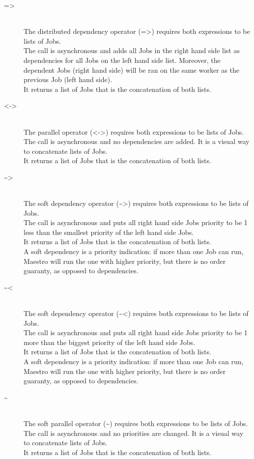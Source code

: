 \documentclass[12pt]{article}
\begin{document}
\begin{description}
\item[=>] \hfil \\
The distributed dependency operator (=>) requires both expressions to be lists of Jobs.\\
The call is asynchronous and adds all Jobs in the right hand side list as dependencies
for all Jobs on the left hand side list. Moreover, the dependent Jobs (right
hand side)  will be ran on the same worker as the previous Job (left hand
side).\\
It returns a list of Jobs that is the concatenation of both lists.

\item[<->] \hfil \\
The parallel operator (<->) requires both expressions to be lists of Jobs.\\
The call is asynchronous and no dependencies are added. It is a visual way to
concatenate lists of Jobs.\\
It returns a list of Jobs that is the concatenation of both lists.

\item[\textasciitilde>] \hfil \\
The soft dependency operator (\textasciitilde>) requires both expressions to be lists of Jobs.\\
The call is asynchronous and puts all right hand side Jobs priority to be 1 less than the smallest
priority of the left hand side Jobs.\\
It returns a list of Jobs that is the concatenation of both lists.\\
A soft dependency is a priority indication: if more than one Job can run, Maestro will run the
one with higher priority, but there is no order guaranty, as opposed to dependencies.

\item[\textasciitilde<] \hfil \\
The soft dependency operator (\textasciitilde<) requires both expressions to be lists of Jobs.\\
The call is asynchronous and puts all right hand side Jobs priority to be 1 more than the biggest
priority of the left hand side Jobs.\\
It returns a list of Jobs that is the concatenation of both lists.\\
A soft dependency is a priority indication: if more than one Job can run, Maestro will run the
one with higher priority, but there is no order guaranty, as opposed to dependencies.

\item[\textasciitilde] \hfil \\
The soft parallel operator (\textasciitilde) requires both expressions to be lists of Jobs.\\
The call is asynchronous and no priorities are changed. It is a visual way to
concatenate lists of Jobs.\\
It returns a list of Jobs that is the concatenation of both lists.
\end{description}
\end{document}

